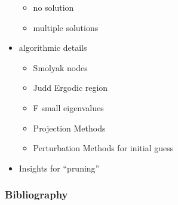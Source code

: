 \documentclass[tikz]{beamer}
\begin{document}
\begin{frame}
\begin{itemize}
    \begin{itemize}
    \item no solution
    \item multiple solutions
    \end{itemize}
\item algorithmic details
  \begin{itemize}
 \item Smolyak nodes
 \item Judd Ergodic region
 \item F small eigenvalues
 \item Projection Methods
 \item Perturbation Methods for initial guess
  \end{itemize}
\item Insights for ``pruning''
  \end{itemize}
\end{frame}

\begin{frame}
  \frametitle{Bibliography}
  


\end{frame}

\appendix
\end{document}
